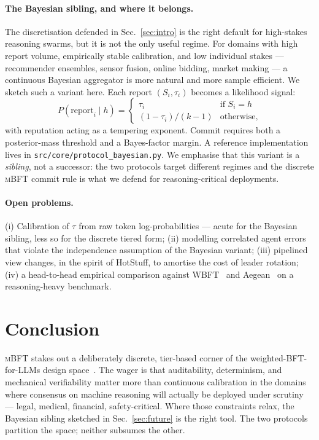 \documentclass[11pt,conference]{IEEEtran}
\newcommand{\tauconf}{\tau}
\newcommand{\mbft}{\textsc{mBFT}}
\begin{document}
\paragraph*{The Bayesian sibling, and where it belongs.}
The discretisation defended in Sec.~\ref{sec:intro} is the right
default for high-stakes reasoning swarms, but it is not the only
useful regime. For domains with high report volume, empirically
stable calibration, and low individual stakes --- recommender
ensembles, sensor fusion, online bidding, market making --- a
continuous Bayesian aggregator is more natural and more sample
efficient. We sketch such a variant here. Each report
$(S_i, \tauconf_i)$ becomes a likelihood signal:
\[
P(\text{report}_i \mid h) =
\begin{cases}
\tauconf_i & \text{if } S_i = h \\
(1-\tauconf_i)/(k-1) & \text{otherwise,}
\end{cases}
\]
with reputation acting as a tempering exponent. Commit requires both a
posterior-mass threshold and a Bayes-factor margin. A reference
implementation lives in \texttt{src/core/protocol\_bayesian.py}. We
emphasise that this variant is a \emph{sibling}, not a successor: the
two protocols target different regimes and the discrete \mbft{} commit
rule is what we defend for reasoning-critical deployments.

\paragraph*{Open problems.}
(i) Calibration of $\tauconf$ from raw token log-probabilities ---
acute for the Bayesian sibling, less so for the discrete tiered form;
(ii) modelling correlated agent errors that violate the independence
assumption of the Bayesian variant;
(iii) pipelined view changes, in the spirit of HotStuff, to amortise
the cost of leader rotation;
(iv) a head-to-head empirical comparison against
WBFT~\cite{wang2025wbft} and Aegean~\cite{aegean2025} on a
reasoning-heavy benchmark.

\section{Conclusion}
\label{sec:conclusion}
\mbft{} stakes out a deliberately discrete, tier-based corner of the
weighted-BFT-for-LLMs design space~\cite{wang2025wbft, aegean2025}.
The wager is that auditability, determinism, and mechanical
verifiability matter more than continuous calibration in the domains
where consensus on machine reasoning will actually be deployed under
scrutiny --- legal, medical, financial, safety-critical. Where those
constraints relax, the Bayesian sibling sketched in
Sec.~\ref{sec:future} is the right tool. The two protocols partition
the space; neither subsumes the other.



\end{document}
